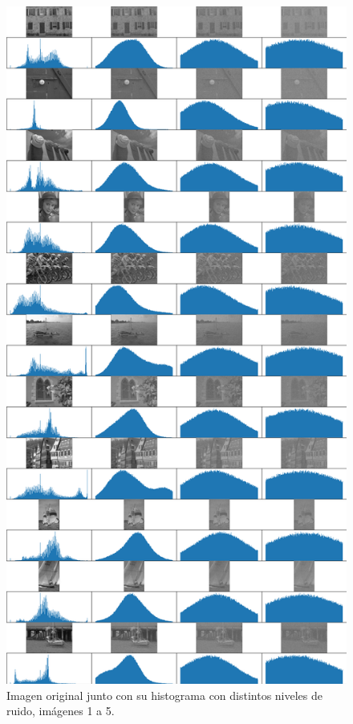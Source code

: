 \begin{figure}
    \centering
    \includegraphics[width=\textwidth]{figuras/img_hist_noise_1.png}
    \caption{Imagen original junto con su histograma con distintos niveles de ruido, im\'agenes 1 a 5.}
\end{figure}


